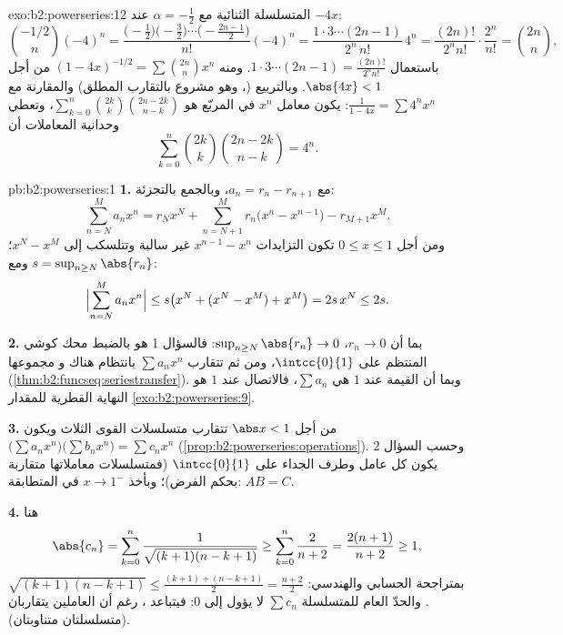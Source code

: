 \begin{solution}{exo:b2:powerseries:12}
المتسلسلة الثنائية مع $\alpha = -\frac12$ عند $-4x$:
\[
\binom{-1/2}{n}(-4)^n
= \frac{\bigl(-\frac12\bigr)\bigl(-\frac32\bigr)\cdots
\bigl(-\frac{2n-1}2\bigr)}{n!}(-4)^n
= \frac{1\cdot3\cdots(2n-1)}{2^n\,n!}\,4^n
= \frac{(2n)!}{2^n n!}\cdot\frac{2^n}{n!}
= \binom{2n}{n},
\]
باستعمال $1\cdot3\cdots(2n-1) = \frac{(2n)!}{2^nn!}$. ومنه
$(1-4x)^{-1/2} = \sum\binom{2n}nx^n$ من أجل $\abs{4x} < 1$.
وبالتربيع (، وهو مشروع بالتقارب المطلق)
والمقارنة مع $\frac{1}{1-4x} = \sum 4^nx^n$: يكون معامل
$x^n$ في المربّع هو
$\sum_{k=0}^n\binom{2k}k\binom{2n-2k}{n-k}$، وتعطي وحدانية
المعاملات أن
\[
\sum_{k=0}^{n}\binom{2k}{k}\binom{2n-2k}{n-k} = 4^n .
\]
\end{solution}

\begin{solution}{pb:b2:powerseries:1}
\textbf{1.} مع $a_n = r_n - r_{n+1}$، وبالجمع بالتجزئة:
\[
\sum_{n=N}^{M} a_nx^n
= r_Nx^N + \sum_{n=N+1}^{M} r_n\bigl(x^n - x^{n-1}\bigr)
- r_{M+1}x^M .
\]
ومن أجل $0 \leq x \leq 1$ تكون التزايدات $x^{n-1} - x^n$
غير سالبة وتتلسكب إلى $x^N - x^M$؛ ومع $s = \sup_{n\geq
N}\abs{r_n}$:
\[
\Bigl|\sum_{n=N}^{M}a_nx^n\Bigr|
\leq s\bigl(x^N + (x^N - x^M) + x^M\bigr) = 2s\,x^N \leq 2s .
\]

\textbf{2.} بما أن $r_n \to 0$، $\sup_{n\geq N}\abs{r_n} \to 0$:
فالسؤال 1 هو بالضبط محك كوشي المنتظم على
$\intcc{0}{1}$، ومن ثم تتقارب $\sum a_nx^n$ بانتظام هناك و
مجموعها  (\cref{thm:b2:funcseq:seriestransfer}).
وبما أن القيمة عند $1$ هي $\sum a_n$، فالاتصال عند $1$ هو
النهاية القطرية للمقدار \cref{exo:b2:powerseries:9}.

\textbf{3.} من أجل $\abs x < 1$ تتقارب متسلسلات القوى الثلاث
 ويكون $\bigl(\sum a_nx^n\bigr)\bigl(\sum b_nx^n\bigr)
= \sum c_nx^n$ (\cref{prop:b2:powerseries:operations}). وحسب
السؤال 2 يكون كل عامل وطرف الجداء  على
$\intcc{0}{1}$ (فمتسلسلات معاملاتها متقاربة بحكم
الفرض)؛ وبأخذ $x \to 1^-$ في المتطابقة: $AB = C$.

\textbf{4.} هنا
\[
\abs{c_n} = \sum_{k=0}^{n}
\frac{1}{\sqrt{(k+1)(n-k+1)}}
\geq \sum_{k=0}^{n}\frac{2}{n+2}
= \frac{2(n+1)}{n+2} \geq 1,
\]
بمتراجحة الحسابي والهندسي: $\sqrt{(k+1)(n-k+1)} \leq \frac{(k+1) +
(n-k+1)}{2} = \frac{n+2}{2}$. والحدّ العام للمتسلسلة $\sum c_n$
لا يؤول إلى $0$: فيتباعد ، رغم أن
العاملين يتقاربان (متسلسلتان متناوبتان).


\end{solution}

